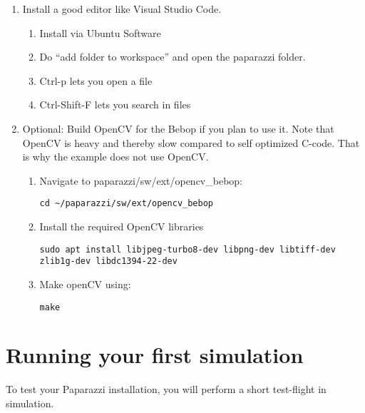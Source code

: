 \begin{enumerate}
	\item Install a good editor like Visual Studio Code.
		
	\begin{enumerate}
		\item{Install via Ubuntu Software}
		\item{Do ``add folder to workspace'' and open the paparazzi folder.}
		\item{Ctrl-p lets you open a file}
		\item{Ctrl-Shift-F lets you search in files}
	\end{enumerate}
	
	\item Optional: Build OpenCV for the Bebop if you plan to use it. Note that OpenCV is heavy and thereby slow compared to self
	optimized C-code. That is why the example does not use OpenCV.

	\begin{enumerate}
		\item Navigate to paparazzi/sw/ext/opencv\_bebop:
		\begin{lstlisting}[style=Bash]
			cd ~/paparazzi/sw/ext/opencv_bebop
		\end{lstlisting}
		\item Install the required OpenCV libraries
		\begin{lstlisting}[style=Bash]
			sudo apt install libjpeg-turbo8-dev libpng-dev libtiff-dev zlib1g-dev libdc1394-22-dev
		\end{lstlisting}
		\item Make openCV using:
		\begin{lstlisting}[style=Bash]
			make
		\end{lstlisting}
	\end{enumerate}

\end{enumerate}


\section{Running your first simulation}

To test your Paparazzi installation, you will perform a short test-flight in simulation.

